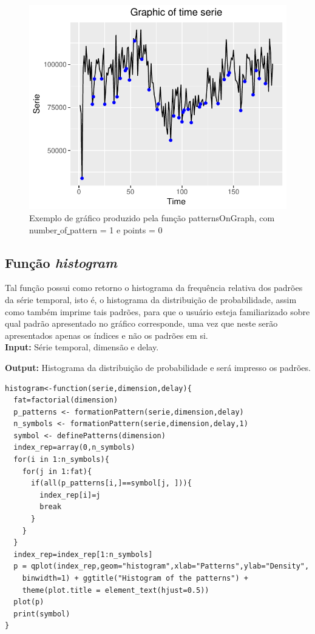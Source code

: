 \documentclass[12pt,letterpaper]{article}
\begin{document}
\begin{figure}[!hbt]
	\begin{center}
		\includegraphics[width=\columnwidth]{patternOnGraph.pdf}
		\caption{Exemplo de gráfico produzido pela função patternsOnGraph, com number\underline{ }of\underline{ }pattern = 1 e points = 0}
		\label{fig:patternOnGraph.pdf}
	\end{center}
\end{figure}

\subsection{Função \textit{histogram}}

Tal função possui como retorno o histograma da frequência relativa dos padrões da série temporal, isto é, o histograma da distribuição de probabilidade, assim como também imprime tais padrões, para que o usuário esteja familiarizado sobre qual padrão apresentado no gráfico corresponde, uma vez que neste serão apresentados apenas os índices e não os padrões em si.\\

\textbf{Input: } Série temporal, dimensão e delay.

\textbf{Output: } Histograma da distribuição de probabilidade e será impresso os padrões.\\

\begin{lstlisting}
histogram<-function(serie,dimension,delay){
  fat=factorial(dimension)
  p_patterns <- formationPattern(serie,dimension,delay)
  n_symbols <- formationPattern(serie,dimension,delay,1)
  symbol <- definePatterns(dimension)
  index_rep=array(0,n_symbols)
  for(i in 1:n_symbols){
    for(j in 1:fat){
      if(all(p_patterns[i,]==symbol[j, ])){
        index_rep[i]=j
        break
      }
    }
  }
  index_rep=index_rep[1:n_symbols]
  p = qplot(index_rep,geom="histogram",xlab="Patterns",ylab="Density",
  	binwidth=1) + ggtitle("Histogram of the patterns") +
    theme(plot.title = element_text(hjust=0.5))
  plot(p)
  print(symbol)
}
\end{lstlisting}
\end{document}
